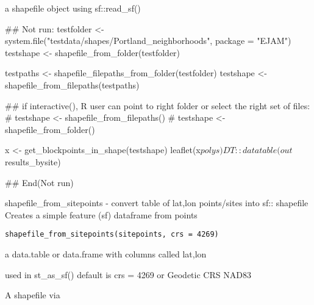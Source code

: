 \documentclass[a4paper]{book}
\begin{document}
%
\begin{Value}
a shapefile object using sf::read\_sf()
\end{Value}
%
\begin{Examples}
\begin{ExampleCode}
## Not run: 
  testfolder <- system.file("testdata/shapes/Portland_neighborhoods", package = "EJAM")
  testshape <- shapefile_from_folder(testfolder)
  
  testpaths <- shapefile_filepaths_from_folder(testfolder)
  testshape <- shapefile_from_filepaths(testpaths)
  
  ## if interactive(), R user can point to right folder or select the right set of files:
  # testshape <- shapefile_from_filepaths()
  # testshape <- shapefile_from_folder()
  
  x <- get_blockpoints_in_shape(testshape)
  leaflet(x$polys) %
  DT::datatable(out$results_bysite)
  
  
## End(Not run)
  
\end{ExampleCode}
\end{Examples}
%
\begin{Description}\relax
shapefile\_from\_sitepoints - convert table of lat,lon points/sites into sf:: shapefile
Creates a simple feature (sf) dataframe from points
\end{Description}
%
\begin{Usage}
\begin{verbatim}
shapefile_from_sitepoints(sitepoints, crs = 4269)
\end{verbatim}
\end{Usage}
%
\begin{Arguments}
\begin{ldescription}
\item[\code{sitepoints}] a data.table or data.frame with columns called lat,lon

\item[\code{crs}] used in st\_as\_sf() default is crs = 4269 or Geodetic CRS NAD83
\end{ldescription}
\end{Arguments}
%
\begin{Value}
A shapefile via 
\end{Value}
\end{document}
